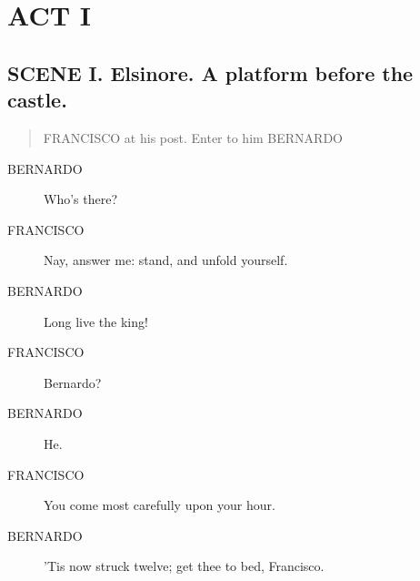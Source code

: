 \documentclass{article}
\begin{document}
  
\section{ACT I}
    
\subsection{SCENE I.  Elsinore. A platform before the castle.}
          
\begin{quote}
FRANCISCO at his post. Enter to him BERNARDO
\end{quote}
          
\begin{description}
            
\item[BERNARDO] Who's there?
\end{description}
          
\begin{description}
            
\item[FRANCISCO] Nay, answer me: stand, and unfold yourself.
\end{description}
          
\begin{description}
            
\item[BERNARDO] Long live the king!
\end{description}
          
\begin{description}
            
\item[FRANCISCO] Bernardo?
\end{description}
          
\begin{description}
            
\item[BERNARDO] He.
\end{description}
          
\begin{description}
            
\item[FRANCISCO] You come most carefully upon your hour.
\end{description}
          
\begin{description}
            
\item[BERNARDO] 'Tis now struck twelve; get thee to bed, Francisco.
\end{description}
          
\end{document}
